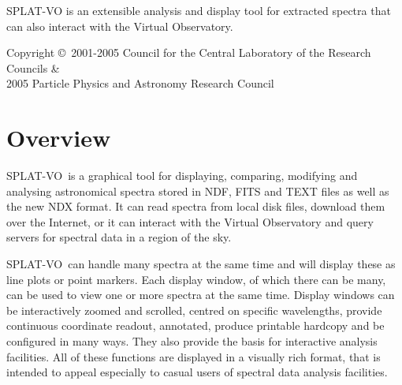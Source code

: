 \documentclass[twoside,11pt]{article}
\newcommand{\stardocinitials}  {SUN}
\newcommand{\stardoccopyright}
{Copyright \copyright\ 2001-2005 Council for the Central Laboratory of the
Research Councils \& \\
2005 Particle Physics and Astronomy Research Council}
\newcommand{\stardocnumber}    {243.10}
\newcommand{\stardocabstract}  {
\textsf{SPLAT-VO} is an extensible analysis and display tool for extracted
spectra that can also interact with the Virtual Observatory.
}
\newcommand{\stardocname}{\stardocinitials /\stardocnumber}
\newenvironment{latexonly}{}{}
\newcommand{\xlabel}[1]{}
\renewcommand{\_}{\texttt{\symbol{95}}}
\newcommand{\SPLAT}{\textsf{SPLAT-VO}}
\renewcommand{\thepage}{\roman{page}}
\begin{document}
\begin{center}
\stardocabstract
\end{center}

\begin{latexonly}
\newpage
\vspace*{\fill}
\stardoccopyright
\end{latexonly}

\newpage
\begin{latexonly}
  \setlength{\parskip}{0mm}
  \tableofcontents
  \setlength{\parskip}{\medskipamount}
  \markboth{\stardocname}{\stardocname}
\end{latexonly}

\cleardoublepage
\renewcommand{\thepage}{\arabic{page}}
\setcounter{page}{1}


\section{Overview\xlabel{overview}}

\SPLAT\ is a graphical tool for displaying, comparing, modifying and
analysing astronomical spectra stored in NDF, FITS and TEXT files as well as
the new NDX format. It can read spectra from local disk files, download them
over the Internet, or it can interact with the Virtual Observatory and query
servers for spectral data in a region of the sky.

\SPLAT\ can handle many spectra at the same time and will display these as
line plots or point markers.
Each display window, of which there can be many, can be used to
view one or more spectra at the same time.
Display windows can be interactively zoomed and scrolled, centred on
specific wavelengths, provide continuous coordinate readout, annotated,
produce printable hardcopy and be configured in many ways.
They also provide the basis for interactive analysis facilities.
All of these functions are displayed in a visually rich format, that
is intended to appeal especially to casual users of spectral data
analysis facilities.
\end{document}
